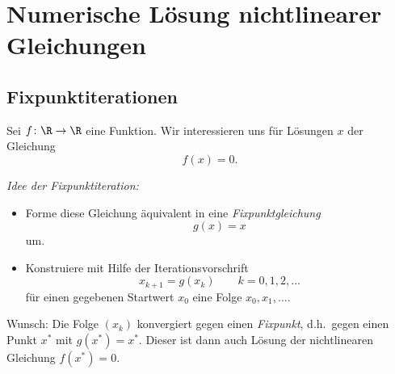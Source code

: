\chapter{Numerische Lösung nichtlinearer Gleichungen}

\section{Fixpunktiterationen}
Sei $f \colon \R \to \R$ eine Funktion. Wir interessieren uns für Lösungen $x$ der Gleichung
\begin{equation*}
 f(x)=0.
\end{equation*}

\medskip

\emph{Idee der Fixpunktiteration:}
\begin{itemize}
 \item Forme diese Gleichung äquivalent in eine \emph{Fixpunktgleichung}
\begin{equation*}
 g(x)=x
\end{equation*}
um.
 \item Konstruiere mit Hilfe der Iterationsvorschrift
 \begin{equation*}
  x_{k+1}=g(x_k) \qquad k=0,1,2,\ldots
 \end{equation*}
für einen gegebenen Startwert $x_0$ eine Folge $x_0,x_1,\ldots$.
\end{itemize}
Wunsch: Die Folge $( x_k )$ konvergiert gegen einen \emph{Fixpunkt},
  d.h.\ gegen einen Punkt $x^*$ mit $g(x^*)=x^*$.
  Dieser ist dann auch Lösung der nichtlinearen Gleichung $f(x^*)=0$.

\bigskip

